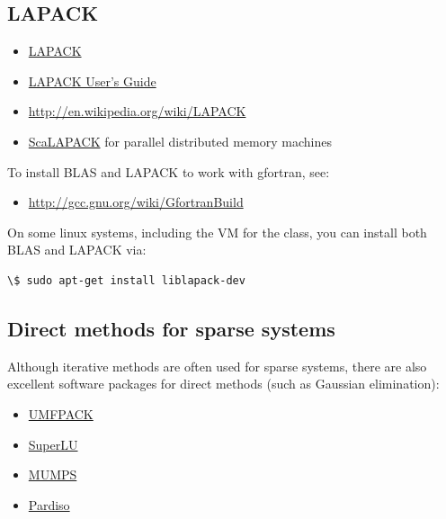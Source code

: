 \documentclass[letterpaper,10pt,english]{sphinxmanual}
\begin{document}
\subsection{LAPACK}
\label{linalg:lapack}\label{linalg:linalg-lapack}\begin{itemize}
\item {} 
\href{http://www.netlib.org/lapack/}{LAPACK}

\item {} 
\href{http://www.netlib.org/lapack/lug/}{LAPACK User's Guide}

\item {} 
\href{http://en.wikipedia.org/wiki/LAPACK}{http://en.wikipedia.org/wiki/LAPACK}

\item {} 
\href{http://www.netlib.org/scalapack/}{ScaLAPACK} for parallel distributed memory
machines

\end{itemize}

To install BLAS and LAPACK to work with gfortran, see:
\begin{itemize}
\item {} 
\href{http://gcc.gnu.org/wiki/GfortranBuild}{http://gcc.gnu.org/wiki/GfortranBuild}

\end{itemize}

On some linux systems, including the VM for the class, you can install both
BLAS and LAPACK via:

\begin{Verbatim}[commandchars=\\\{\}]
\$ sudo apt-get install liblapack-dev
\end{Verbatim}


\subsection{Direct methods for sparse systems}
\label{linalg:direct-methods-for-sparse-systems}\label{linalg:linalg-spdirect}
Although iterative methods are often used for sparse systems, there are also
excellent software packages for direct methods (such as Gaussian
elimination):
\begin{itemize}
\item {} 
\href{http://www.cise.ufl.edu/research/sparse/umfpack/}{UMFPACK}

\item {} 
\href{http://crd-legacy.lbl.gov/~xiaoye/SuperLU/}{SuperLU}

\item {} 
\href{http://graal.ens-lyon.fr/MUMPS/}{MUMPS}

\item {} 
\href{http://www.pardiso-project.org/}{Pardiso}

\end{itemize}
\end{document}
